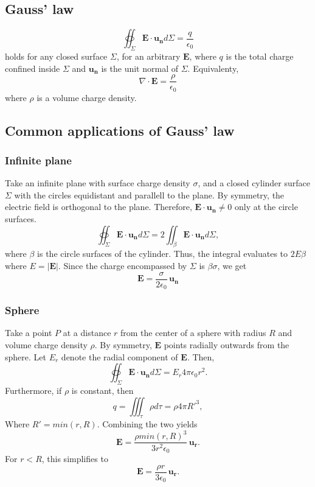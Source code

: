 \documentclass[a4paper, 12pt]{article}
\renewcommand{\vec}[1]{\mathbf{#1}}
\newcommand{\E}{\ensuremath{\vec{E}}}
\newcommand{\e}{\ensuremath{\epsilon_0}}
\begin{document}
\subsection{Gauss' law}
    \begin{equation}
        \oiint_\Sigma \E\cdot\vec{u_n}d\Sigma = \frac{q}{\e}
    \end{equation}
    holds for any closed surface $\Sigma$, for an arbitrary $\E$, where $q$ is the total charge confined inside $\Sigma$ and $\vec{u_n}$ is the unit normal of $\Sigma$. Equivalenty, 
    \begin{equation}
        \nabla \cdot \E = \frac{\rho}{\e}
    \end{equation}
    where $\rho$ is a volume charge density. 
\subsection{Common applications of Gauss' law}
    \subsubsection{Infinite plane}
        Take an infinite plane with surface charge density $\sigma$, and a closed cylinder surface $\Sigma$ with the circles equidistant and parallell to the plane. By symmetry, the electric field is orthogonal to the plane. Therefore, $\E\cdot\vec{u_n} \neq 0$ only at the circle surfaces. 
        \begin{equation*}
            \oiint_\Sigma \E\cdot\vec{u_n}d\Sigma = 2\iint_\beta \E\cdot\vec{u_n}d\Sigma,
        \end{equation*}
        where $\beta$ is the circle surfaces of the cylinder. Thus, the integral evaluates to $2E\beta$ where $E = |\E|$. Since the charge encompassed by $\Sigma$ is $\beta\sigma$, we get
        \begin{equation}
            \E = \frac{\sigma}{2\e}\,\vec{u_n}
        \end{equation}
    \subsubsection{Sphere}
        Take a point $P$ at a distance $r$ from the center of a sphere with radius $R$ and volume charge density $\rho$. By symmetry, $\E$ points radially outwards from the sphere. Let $E_r$ denote the radial component of $\E$. Then, 
        \begin{equation*}
            \oiint_\Sigma \E\cdot\vec{u_n}d\Sigma = E_r4\pi\e r^2.
        \end{equation*}
        Furthermore, if $\rho$ is constant, then
        \begin{equation*}
            q = \iiint_\tau \rho d\tau = \rho4\pi R'^3,
        \end{equation*}
        Where $R' = min(r, R)$. Combining the two yields
        \begin{equation}
            \E = \frac{\rho min(r, R)^3}{3r^2\e}\,\vec{u_r}.
        \end{equation}
        For $r < R$, this simplifies to
        \begin{equation}
            \E = \frac{\rho r}{3\e}\,\vec{u_r}.
        \end{equation}
\end{document}
